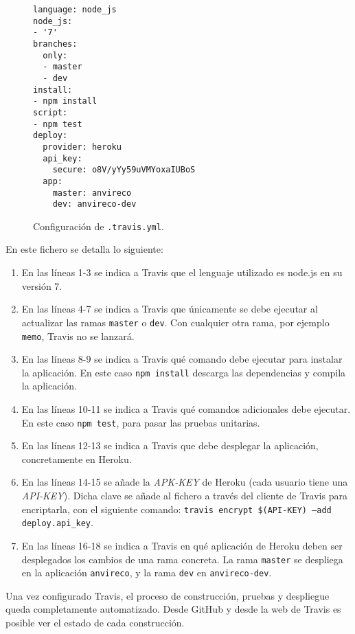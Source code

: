 \begin{figure}[H]
\begin{verbatim}
language: node_js
node_js:
- '7'
branches:
  only:
  - master
  - dev
install:
- npm install
script:
- npm test
deploy:
  provider: heroku
  api_key:
    secure: o8V/yYy59uVMYoxaIUBoS
  app:
    master: anvireco
    dev: anvireco-dev
\end{verbatim}
\caption{Configuración de \texttt{.travis.yml}.} 
\label{travis-yml}
\end{figure}

En este fichero se detalla lo siguiente:

\begin{enumerate}
	\item En las líneas 1-3 se indica a Travis que el lenguaje utilizado es node.js en su versión 7.
	\item En las líneas 4-7 se indica a Travis que únicamente se debe ejecutar al actualizar las ramas \texttt{master} o \texttt{dev}. Con cualquier otra rama, por ejemplo \texttt{memo}, Travis no se lanzará.
	\item En las líneas 8-9 se indica a Travis qué comando debe ejecutar para instalar la aplicación. En este caso \texttt{npm install} descarga las dependencias y compila la aplicación.
	\item En las líneas 10-11 se indica a Travis qué comandos adicionales debe ejecutar. En este caso \texttt{npm test}, para pasar las pruebas unitarias.
	\item En las líneas 12-13 se indica a Travis que debe desplegar la aplicación, concretamente en Heroku.
	\item En las líneas 14-15 se añade la \textit{APK-KEY} de Heroku (cada usuario tiene una \textit{API-KEY}). Dicha clave se añade al fichero a través del cliente de Travis para encriptarla, con el siguiente comando: \texttt{travis encrypt \$(API-KEY) --add deploy.api\_key}.
	\item En las líneas 16-18 se indica a Travis en qué aplicación de Heroku deben ser desplegados los cambios de una rama concreta. La rama \texttt{master} se despliega en la aplicación \texttt{anvireco}, y la rama \texttt{dev} en \texttt{anvireco-dev}.
\end{enumerate}

Una vez configurado Travis, el proceso de construcción, pruebas y despliegue queda completamente automatizado. Desde GitHub y desde la web de Travis es posible ver el estado de cada construcción.

